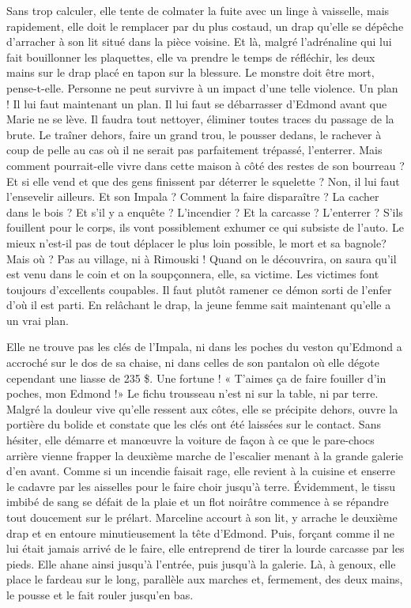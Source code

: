 Sans trop calculer, elle tente de colmater la fuite avec un linge à vaisselle, mais rapidement, elle doit le remplacer par du plus costaud, un drap qu’elle se dépêche d’arracher à son lit situé dans la pièce voisine. Et là, malgré l’adrénaline qui lui fait bouillonner les plaquettes, elle va prendre le temps de réfléchir, les deux mains sur le drap placé en tapon sur la blessure. Le monstre doit être mort, pense-t-elle. Personne ne peut survivre à un impact d’une telle violence. Un plan ! Il lui faut maintenant un plan. Il lui faut se débarrasser d’Edmond avant que Marie ne se lève. Il faudra tout nettoyer, éliminer toutes traces du passage de la brute. Le traîner dehors, faire un grand trou, le pousser dedans, le rachever à coup de pelle au cas où il ne serait pas parfaitement trépassé, l’enterrer. Mais comment pourrait-elle vivre dans cette maison à côté des restes de son bourreau ? Et si elle vend et que des gens finissent par déterrer le squelette ? Non, il lui faut l’ensevelir ailleurs. Et son Impala ? Comment la faire disparaître ? La cacher dans le bois ? Et s’il y a enquête ? L’incendier ? Et la carcasse ? L’enterrer ? S’ils fouillent pour le corps, ils vont possiblement exhumer ce qui subsiste de l’auto. Le mieux n’est-il pas de tout déplacer le plus loin possible, le mort et sa bagnole? Mais où ? Pas au village, ni à Rimouski ! Quand on le découvrira, on saura qu’il est venu dans le coin et on la soupçonnera, elle, sa victime. Les victimes font toujours d’excellents coupables. Il faut plutôt ramener ce démon sorti de l’enfer d’où il est parti. En relâchant le drap, la jeune femme sait maintenant qu’elle a un vrai plan.

Elle ne trouve pas les clés de l’Impala, ni dans les poches du veston qu’Edmond a accroché sur le dos de sa chaise, ni dans celles de son pantalon où elle dégote cependant une liasse de 235 \$. Une fortune ! « T’aimes ça de faire fouiller d’in poches, mon Edmond !» Le fichu trousseau n’est ni sur la table, ni par terre. Malgré la douleur vive qu’elle ressent aux côtes, elle se précipite dehors, ouvre la portière du bolide et constate que les clés ont été laissées sur le contact. Sans hésiter, elle démarre et manœuvre la voiture de façon à ce que le pare-chocs arrière vienne frapper la deuxième marche de l’escalier menant à la grande galerie d’en avant. Comme si un incendie faisait rage, elle revient à la cuisine et enserre le cadavre par les aisselles pour le faire choir jusqu’à terre. Évidemment, le tissu imbibé de sang se défait de la plaie et un flot noirâtre commence à se répandre tout doucement sur le prélart. Marceline accourt à son lit, y arrache le deuxième drap et en entoure minutieusement la tête d’Edmond. Puis, forçant comme il ne lui était jamais arrivé de le faire, elle entreprend de tirer la lourde carcasse par les pieds. Elle ahane ainsi jusqu’à l’entrée, puis jusqu’à la galerie. Là, à genoux, elle place le fardeau sur le long, parallèle aux marches et, fermement, des deux mains, le pousse et le fait rouler jusqu’en bas.

